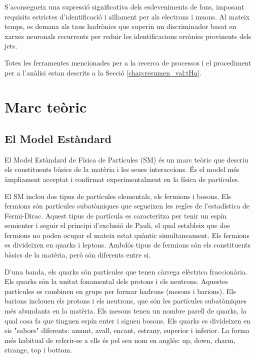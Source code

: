 S'aconsegueix una supressió significativa dels esdeveniments de fons, imposant requisits estrictes d'identificació i aïllament 
per als electrons i muons. Al mateix temps, es demana als taus hadrònics que superin un discriminador basat en xarxes 
neuronals recurrents per reduir les identificacions errònies provinents dels jets.

Totes les ferramentes mencionades per a la recerca de processos \tH i el procediment per a l'anàlisi estan descrits a la 
Secció \ref{chap:resumen_val:tHq}.

\section{Marc teòric}
\label{chap:resumen_val:Teoria}

\subsection{El Model Estàndard}
El Model Estàndard de Física de Partícules (SM) és un marc teòric que descriu els constituents 
bàsics de la matèria i les seues interaccions. És el model més àmpliament acceptat i confirmat experimentalment 
en la física de partícules.

El SM inclou dos tipus de partícules elementals, els fermions i bosons.
Els fermions són partícules subatòmiques que segueixen les regles de l'estadística de Fermi-Dirac. 
Aquest tipus de partícula es caracteritza per tenir un espín semienter i seguir el principi d'exclusió 
de Pauli, el qual estableix que dos fermions no poden ocupar el mateix estat quàntic simultaneament. 
Els fermions es divideixen en quarks i leptons. Ambdós tipus de fermions són els constituents bàsics 
de la matèria, però són diferents entre si.

D'una banda, els quarks són partícules que tenen càrrega elèctrica fraccionària. Els quarks són la unitat fonamental 
dels protons i els neutrons. Aquestes partícules es combinen en grups per formar hadrons (mesons i barions). Els barions 
inclouen els protons i els neutrons, que són les partícules subatòmiques més abundants en la matèria. Els mesons tenen un 
nombre parell de quarks, la qual cosa fa que tinguen espín enter i siguen bosons. Els quarks es divideixen en sis "sabors" 
diferents: amunt, avall, encant, estrany, superior i inferior. La forma més habitual de referir-se a ells és pel seu nom en anglés: 
up, down, charm, strange, top i bottom.

